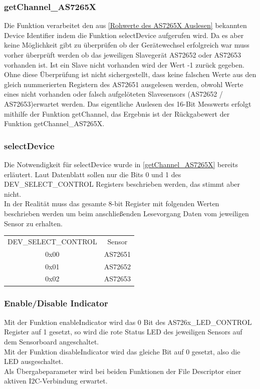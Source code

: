 \subsubsection{getChannel\_AS7265X}
Die Funktion verarbeitet den aus \ref{Rohwerte des AS7265X Auslesen} bekannten Device Identifier indem die Funktion selectDevice aufgerufen wird.
	Da es aber keine Möglichkeit gibt zu überprüfen ob der Gerätewechsel erfolgreich war muss vorher überprüft werden ob das jeweiligen Slavegerät AS72652 oder AS72653 vorhanden ist.
	Ist ein Slave nicht vorhanden wird der Wert -1 zurück gegeben.
	Ohne diese Überprüfung ist nicht sichergestellt, dass keine falschen Werte aus den gleich nummerierten Registern des AS72651 ausgelesen werden, obwohl Werte eines nicht vorhanden oder falsch aufgelöteten Slavesensors (AS72652 / AS72653)erwartet werden.
	Das eigentliche Auslesen des 16-Bit Messwerts erfolgt mithilfe der Funktion getChannel, das Ergebnis ist der Rückgabewert der Funktion getChannel\_AS7265X.\\



\subsubsection{selectDevice}
Die Notwendigkeit für selectDevice wurde in \ref{getChannel_AS7265X} bereits erläutert.
Laut Datenblatt sollen nur die Bits 0 und 1 des DEV\_SELECT\_CONTROL Registers beschrieben werden, das stimmt aber nicht.\\
In der Realität muss das gesamte 8-bit Register mit folgenden Werten beschrieben werden um beim anschließenden Lesevorgang Daten vom jeweiligen Sensor zu erhalten.
\begin{center}
\begin{tabular}{ c c }
 	DEV\_SELECT\_CONTROL & Sensor \\ 
 	0x00 & AS72651 \\  
 	0x01 & AS72652 \\
 	0x02 & AS72653 \\  
\end{tabular}
\end{center}



\subsubsection{Enable/Disable Indicator}
Mit der Funktion enableIndicator wird das 0 Bit des AS726x\_LED\_CONTROL Register auf 1 gesetzt, so wird die rote Status LED des jeweiligen Sensors auf dem Sensorboard angeschaltet.\\
Mit der Funktion disableIndicator wird das gleiche Bit auf 0 gesetzt, also die LED ausgeschaltet.\\
Als Übergabeparameter wird bei beiden Funktionen der File Descriptor einer aktiven I2C-Verbindung erwartet.\\

